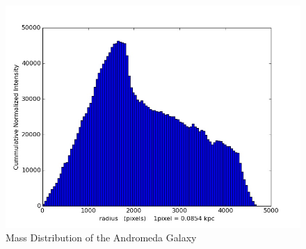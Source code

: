 \begin{enumerate}
\begin{verbatim}
\end{verbatim}
\begin{figure} [h]
\centering
\includegraphics[scale=0.5]{histogram.jpg}
\caption{Mass Distribution of the Andromeda Galaxy }
\end{figure}


\end{enumerate}
